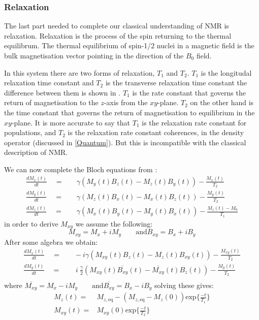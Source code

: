 \subsubsection{Relaxation}\label{Relaxation}

The last part needed to complete our classical understanding of NMR is relaxation. Relaxation is the process
of the spin returning to the thermal equilibrum. The thermal equilibrium of spin-1/2 nuclei in a
magnetic field is the bulk magnetisation vector pointing in the direction of the $B_0$ field.

In this system there are two forms of relaxation, $T_1$ and $T_2$. $T_1$ is the longitudal relaxation time
constant and $T_2$ is the transverse relaxation time constant the difference between them is shown in .
$T_1$ is the rate constant that governs the return of magnetisation to the $z$-axis from the $xy$-plane. $T_2$ on
the other hand is the time constant that governs the return of magnetisation to equilibrium in the $xy$-plane.
It is more accurate to say that $T_1$ is the relaxation rate constant for populations, and $T_2$ is the relaxation
rate constant coherences, in the density operator (discussed in \ref{Quantum}). But this is incompatible
with the classical description of NMR.

We can now complete the Bloch equations from :
\begin{align}
  \frac{dM_x(t)}{dt}\quad=&\quad\gamma(M_y(t)B_z(t)-M_z(t)B_y(t)) - \frac{M_x(t)}{T_2}\\
  \frac{dM_y(t)}{dt}\quad=&\quad\gamma(M_z(t)B_x(t)-M_x(t)B_z(t)) - \frac{M_y(t)}{T_2}\\
  \frac{dM_z(t)}{dt}\quad=&\quad\gamma(M_x(t)B_y(t)-M_y(t)B_x(t)) - \frac{M_z(t)-M_0}{T_1}
\end{align}
in order to derive $M_{xy}$ we assume the following:
\begin{equation}
  M_{xy} = M_x + iM_y\qquad\text{and} B_{xy} = B_x + iB_y
\end{equation}
After some algebra we obtain:
\begin{align}
  \frac{dM_x(t)}{dt}\quad=&\quad-i\gamma(M_{xy}(t)B_z(t)-M_z(t)B_{xy}(t)) - \frac{M_{xy}(t)}{T_2}\\
  \frac{dM_y(t)}{dt}\quad=&\quad~i~\frac{\gamma}{2}(M_{xy}(t)\overline{B_{xy}}(t)-\overline{M_{xy}}(t)B_z(t)) - \frac{M_y(t)}{T_2}\\
\end{align}
where $\overline{M_{xy}} = M_x - iM_y\qquad\text{and} \overline{B_{xy}} = B_x - iB_y$
solving these gives:
\begin{align}
  M_z(t) =& M_{z,\text{eq}} - (M_{z,\text{eq}}-M_z(0))\text{exp}\{\frac{-t}{T_1}\}\\
  M_{xy}(t) =& M_{xy}(0)\text{exp}\{\frac{-t}{T_2}\}
\end{align}

